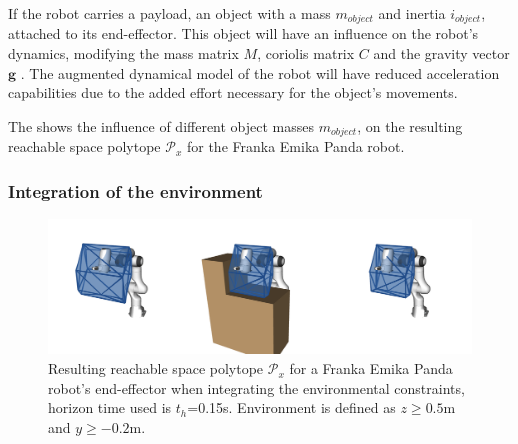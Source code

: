 If the robot carries a payload, an object with a mass $m_{object}$ and inertia $i_{object}$, attached to its end-effector. This object will have an influence on the robot's dynamics, modifying the mass matrix $M$, coriolis matrix $C$ and the gravity vector $\bm{g}$ \cite{hamad2019}.
The augmented dynamical model of the robot will have reduced acceleration capabilities due to the added effort necessary for the object's movements.


The  shows the influence of different object masses $m_{object}$, on the resulting reachable space polytope $\mathcal{P}_x$ for the {Franka Emika Panda} robot. 

\subsubsection{Integration of the environment}

\begin{figure}[!b]
    \centering
    \includegraphics[width=\linewidth]{Papers/images/env.png}
    \caption{Resulting reachable space polytope $\mathcal{P}_x$ for a Franka Emika Panda robot's end-effector when integrating the environmental constraints, horizon time used is $t_h$=0.15s. Environment is defined as $z\geq0.5$m and $y\geq-0.2$m.}
    \label{fig:env}
    
\end{figure}

